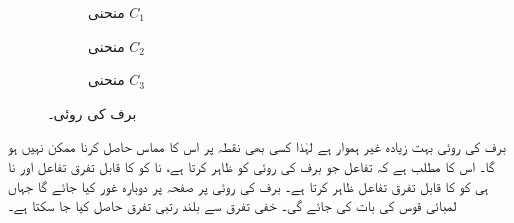 \begin{figure}
\centering
\begin{subfigure}{0.22\textwidth}
\centering
{}
\caption{منحنی $C_1$}
\end{subfigure}\hfill
\begin{subfigure}{0.22\textwidth}
\centering
{}
\caption{منحنی $C_2$}
\end{subfigure}\hfill
\begin{subfigure}{0.22\textwidth}
\centering
{}
\caption{منحنی $C_3$}
\end{subfigure}
\caption{برف کی روئی۔}
\label{شکل_تفرق_روئی_برف}
\end{figure}

برف کی روئی بہت زیادہ غیر ہموار ہے لہٰذا کسی بھی نقطہ پر اس کا مماس حاصل کرنا ممکن نہیں ہو گا۔ اس کا مطلب ہے کہ تفاعل  جو برف کی روئی کو ظاہر کرتا ہے،  نا  کو   کا قابل تفرق تفاعل اور نا ہی  کو  کا قابل تفرق تفاعل ظاہر  کرتا ہے۔ برف کی روئی پر صفحہ  پر دوبارہ غور کیا جائے گا جہاں لمبائی قوس کی بات کی جائے گی۔
خفی تفرق سے بلند رتبی تفرق حاصل کیا جا سکتا ہے۔

